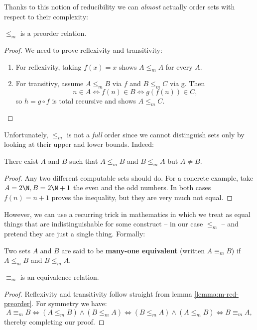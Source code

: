 \documentclass[../main.tex]{memoir}
\begin{document}
Thanks to this notion of reducibility we can \textit{almost} actually order sets with respect to their complexity:

\begin{lemma}
  \label{lemma:m-red-preorder}
  $\le_m$ is a preorder relation.
\end{lemma}
\begin{proof}
  We need to prove reflexivity and transitivity:
  \begin{enumerate}
  \item For reflexivity, taking $f(x) = x$ shows $A \le_m A$ for every $A$.
  \item For transitivy, assume $A \le_m B$ via $f$ and $B \le_m C$ via g. Then
    \[ n \in A \iff f(n) \in B \iff g(f(n)) \in C, \]
    so $h = g \circ f$ is total recursive and shows $A \le_m C$.
  \end{enumerate}
\end{proof}

Unfortunately, $\le_m$ is not a \textit{full} order since we cannot distinguish sets only by looking at their upper and lower bounds. Indeed:

\begin{lemma}
  There exist $A$ and $B$ such that $A \le_m B$ and $B \le_m A$ but $A \neq B$.
\end{lemma}
\begin{proof}
  Any two different computable sets should do. For a concrete example, take $A = 2\N, B = 2\N + 1$ the even and the odd numbers. In both cases $f(n) = n + 1$ proves the inequality, but they are very much not equal.
\end{proof}

However, we can use a recurring trick in mathematics in which we treat as equal things that are indistinguishable for some construct -- in our case $\le_m$ -- and pretend they are just a single thing. Formally:

\begin{definition}
  Two sets $A$ and $B$ are said to be \textbf{many-one equivalent} (written $A \equiv_m B$) if $A \le_m B$ and $B \le_m A$.
\end{definition}

\begin{lemma}
  $\equiv_m$ is an equivalence relation.
\end{lemma}
\begin{proof}
  Reflexivity and transitivity follow straight from lemma \ref{lemma:m-red-preorder}. For symmetry we have:
  \[ A \equiv_m B \iff (A \le_m B) \land (B \le_m A) \iff (B \le_m A) \land (A \le_m B)  \iff B \equiv_m A, \]
  thereby completing our proof.
\end{proof}
\end{document}
